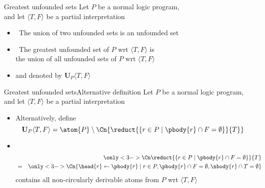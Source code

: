 \begin{frame}{Greatest unfounded sets}{\phantom{Alternative definition}}\label{unf:greatest}
  Let $P$ be a normal logic program,\\ and let
  $\langle T,F \rangle$ be a partial interpretation
  \medskip
  \begin{itemize}
  \item<2->  \ The union of two unfounded sets is an unfounded set
    \medskip
  \item<3->   \ The \alert{greatest unfounded set} of $P$ wrt $\langle T,F \rangle$ is
    \\ the union of all unfounded sets of $P$ wrt $\langle T,F \rangle$
  \item<4-> [] and denoted by $\mathbf{U}_P\langle T,F \rangle$
  \end{itemize}
\end{frame}
\begin{frame}{Greatest unfounded sets}{Alternative definition}
  Let $P$ be a normal logic program,\\ and let
  $\langle T,F \rangle$ be a partial interpretation
  \medskip
  \begin{itemize}
  \item<1-> Alternatively, define
    \[
      \mathbf{U}_P\langle T,F \rangle =
      \atom{P} \setminus
      \Cn{\reduct{\{r \in P \mid \pbody{r} \cap F = \emptyset\}}{T}}
    \]
  \item<2->  \
    \begin{eqnarray*}
      & & \only<3->{\Cn}{\reduct{\{r \in P \mid \pbody{r} \cap F = \emptyset\}}{T}}\\
      &=& \only<3->{\Cn}{\{\head{r}\leftarrow\pbody{r} \mid r\in P, \pbody{r} \cap F = \emptyset, \nbody{r}\cap T=\emptyset\}}
    \end{eqnarray*}
    \pause[3]
    contains all non-circularly derivable atoms from $P$ wrt $\langle T,F \rangle$
  \end{itemize}
\end{frame}
%
